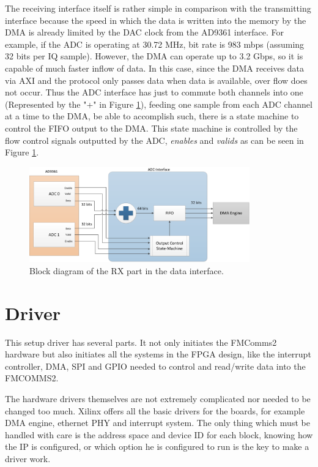 The receiving interface itself is rather simple in comparison with the
transmitting interface because the speed in which the data is written into the
memory by the DMA is already limited by the DAC clock from the AD9361 interface.
For example, if the ADC is operating at 30.72 MHz, bit rate is 983 mbps
(assuming 32 bits per IQ sample). However, the DMA can operate up to 3.2 Gbps,
so it is capable of much faster inflow of data. In this case, since the DMA
receives data via AXI and the protocol only passes data when data is available,
over flow does not occur. Thus the ADC interface has just to commute both
channels into one (Represented by the "+" in Figure \ref{fig:dataifrx}), feeding
one sample from each ADC channel at a time to the DMA, be able to accomplish
such, there is a state machine to control the FIFO output to the DMA. This state
machine is controlled by the flow control signals outputted by the ADC,
\emph{enables} and \emph{valids} as can be seen in Figure \ref{fig:dataifrx}.
\begin{figure}[htbp]
    \centering
    \includegraphics[width=0.85\textwidth]{./figures/rxdata_if}
    \caption{ Block diagram of the RX part in the data interface.
    \label{fig:dataifrx}}
\end{figure}

\section{Driver}
\label{impl:driver}

This setup driver has several parts. It not only initiates the FMComms2 hardware
but also initiates all the systems in the FPGA design, like the interrupt
controller, DMA, SPI and GPIO needed to control and read/write data into the
FMCOMMS2.

The hardware drivers themselves are not extremely complicated nor needed to be
changed too much. Xilinx offers all the basic drivers for the boards, for
example DMA engine, ethernet PHY and interrupt system. The only thing which must
be handled with care is the address space and device ID for each block, knowing
how the IP is configured, or which option he is configured to run is the key to
make a driver work.

